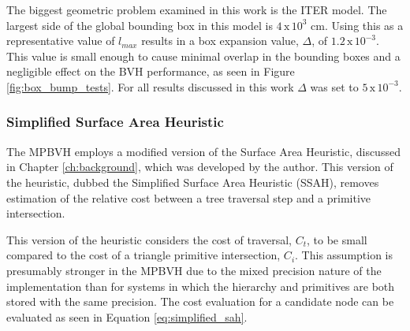 The biggest geometric problem examined in this work is the ITER model. The
largest side of the global bounding box in this model is $4 \, \text{x} \,
10^{3}$ cm. Using this as a representative value of $l_{max}$ results in a box
expansion value, $\Delta$, of $1.2 \, \text{x} \, 10^{-3}$. This value is small
enough to cause minimal overlap in the bounding boxes and a negligible effect on
the BVH performance, as seen in Figure \ref{fig:box_bump_tests}. For all results
discussed in this work $\Delta$ was set to $5 \, \text{x} \, 10 ^{-3}$.

\subsubsection{Simplified Surface Area Heuristic}\label{sec:ssah}

The MPBVH employs a modified version of the Surface Area Heuristic,
discussed in Chapter \ref{ch:background}, which was developed by the
author. This version of the heuristic, dubbed the Simplified Surface Area
Heuristic (SSAH), removes estimation of the relative cost between a tree
traversal step and a primitive intersection.

This version of the heuristic considers the cost of traversal, $C_{t}$, to be
small compared to the cost of a triangle primitive intersection, $C_{i}$. This
assumption is presumably stronger in the MPBVH due to the mixed precision nature
of the implementation than for systems in which the hierarchy and primitives are
both stored with the same precision. The cost evaluation for a candidate node
can be evaluated as seen in Equation \eqref{eq:simplified_sah}.

